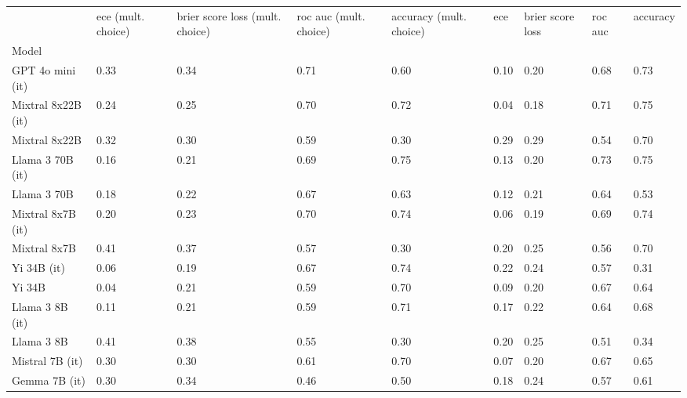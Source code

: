 \begin{tabular}{lllllllll}
\toprule
 & ece (mult. choice) & brier score loss (mult. choice) & roc auc (mult. choice) & accuracy (mult. choice) & ece & brier score loss & roc auc & accuracy \\
Model &  &  &  &  &  &  &  &  \\
\midrule
GPT 4o mini (it) & 0.33 & 0.34 & \cellcolor{cyan!25.0} 0.71 & 0.60 & 0.10 & 0.20 & 0.68 & \cellcolor{cyan!17.6} 0.73 \\
Mixtral 8x22B (it) & 0.24 & 0.25 & \cellcolor{cyan!11.7} 0.70 & \cellcolor{cyan!12.7} 0.72 & \cellcolor{cyan!25.0} 0.04 & \cellcolor{cyan!25.0} 0.18 & \cellcolor{cyan!11.0} 0.71 & \cellcolor{cyan!25.0} 0.75 \\
Mixtral 8x22B & 0.32 & 0.30 & 0.59 & \cellcolor{orange!25.0} 0.30 & \cellcolor{orange!15.5} 0.29 & \cellcolor{orange!3.4} 0.29 & 0.54 & \cellcolor{cyan!0.5} 0.70 \\
Llama 3 70B (it) & 0.16 & \cellcolor{cyan!16.2} 0.21 & \cellcolor{cyan!7.0} 0.69 & \cellcolor{cyan!25.0} 0.75 & 0.13 & 0.20 & \cellcolor{cyan!25.0} 0.73 & \cellcolor{cyan!24.4} 0.75 \\
Llama 3 70B & 0.18 & \cellcolor{cyan!8.3} 0.22 & 0.67 & 0.63 & 0.12 & 0.21 & 0.64 & 0.53 \\
Mixtral 8x7B (it) & 0.20 & \cellcolor{cyan!7.4} 0.23 & \cellcolor{cyan!12.7} 0.70 & \cellcolor{cyan!23.3} 0.74 & \cellcolor{cyan!0.3} 0.06 & \cellcolor{cyan!18.5} 0.19 & 0.69 & \cellcolor{cyan!22.2} 0.74 \\
Mixtral 8x7B & 0.41 & 0.37 & 0.57 & \cellcolor{orange!25.0} 0.30 & 0.20 & 0.25 & 0.56 & 0.70 \\
Yi 34B (it) & \cellcolor{cyan!16.7} 0.06 & \cellcolor{cyan!25.0} 0.19 & 0.67 & \cellcolor{cyan!19.4} 0.74 & 0.22 & 0.24 & 0.57 & \cellcolor{orange!25.0} 0.31 \\
Yi 34B & \cellcolor{cyan!25.0} 0.04 & \cellcolor{cyan!17.2} 0.21 & 0.59 & \cellcolor{cyan!2.1} 0.70 & 0.09 & 0.20 & 0.67 & 0.64 \\
Llama 3 8B (it) & 0.11 & \cellcolor{cyan!12.7} 0.21 & 0.59 & \cellcolor{cyan!7.7} 0.71 & 0.17 & 0.22 & 0.64 & 0.68 \\
Llama 3 8B & 0.41 & 0.38 & 0.55 & \cellcolor{orange!25.0} 0.30 & 0.20 & 0.25 & 0.51 & \cellcolor{orange!6.2} 0.34 \\
Mistral 7B (it) & 0.30 & 0.30 & 0.61 & \cellcolor{cyan!0.4} 0.70 & 0.07 & 0.20 & 0.67 & 0.65 \\
Gemma 7B (it) & 0.30 & 0.34 & \cellcolor{orange!14.6} 0.46 & 0.50 & 0.18 & 0.24 & 0.57 & 0.61 \\

\end{tabular}
